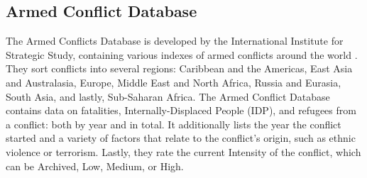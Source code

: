 \subsection{Armed Conflict Database}
The Armed Conflicts Database is developed by the International Institute for Strategic Study, containing various indexes of armed conflicts around the world \cite{conflictDB}. They sort conflicts into several regions: Caribbean and the Americas, East Asia and Australasia, Europe, Middle East and North Africa, Russia and Eurasia, South Asia, and lastly, Sub-Saharan Africa. The Armed Conflict Database contains data on fatalities, Internally-Displaced People (IDP), and refugees from a conflict: both by year and in total. It additionally lists the year the conflict started and a variety of factors that relate to the conflict's origin, such as ethnic violence or terrorism. Lastly, they rate the current Intensity of the conflict, which can be Archived, Low, Medium, or High.